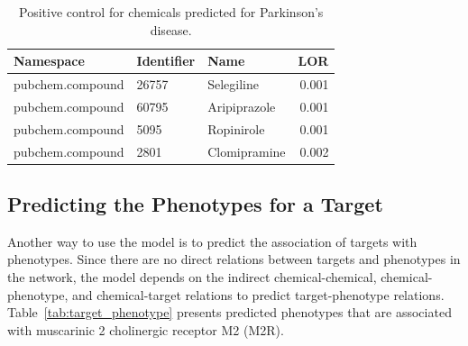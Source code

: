 \begin{table}[!ht]
    \centering
    \begin{tabular}{|l|l|l|r|}
        \hline
        \textbf{Namespace} & \textbf{Identifier} & \textbf{Name} & \textbf{LOR} \\
        \hline
        pubchem.compound & 26757 & Selegiline & 0.001  \\
        \hline
        pubchem.compound & 60795 & Aripiprazole & 0.001 \\
        \hline
        pubchem.compound & 5095 & Ropinirole & 0.001 \\
        \hline
        pubchem.compound & 2801 & Clomipramine & 0.002 \\
        \hline
    \end{tabular}
    \captionsetup{justification=centering}
    \caption{Positive control for chemicals predicted for Parkinson's disease.}
    \label{tab:ps_PD}
\end{table}

\subsection{Predicting the Phenotypes for a Target}

Another way to use the model is to predict the association of targets with phenotypes.
Since there are no direct relations between targets and phenotypes in the network, the model depends on the indirect chemical-chemical, chemical-phenotype, and chemical-target relations to predict target-phenotype relations.
Table~\ref{tab:target_phenotype} presents predicted phenotypes that are associated with muscarinic 2 cholinergic receptor M2 (M2R).

